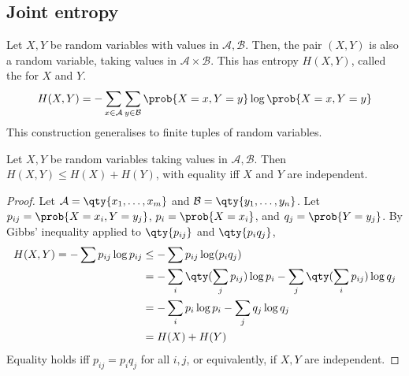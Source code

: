 \subsection{Joint entropy}
Let $X, Y$ be random variables with values in $\mathcal A, \mathcal B$.
Then, the pair $(X, Y)$ is also a random variable, taking values in $\mathcal A \times \mathcal B$.
This has entropy $H(X,Y)$, called the  for $X$ and $Y$.
\begin{align*}
    H(X,Y) = - \sum_{x \in \mathcal A} \sum_{y \in \mathcal B} \prob{X = x, Y = y} \log \prob{X = x, Y = y}
\end{align*}
This construction generalises to finite tuples of random variables.

\begin{lemma}
    Let $X, Y$ be random variables taking values in $\mathcal A, \mathcal B$.
    Then $H(X,Y) \leq H(X) + H(Y)$, with equality iff $X$ and $Y$ are independent.
\end{lemma}

\begin{proof}
    Let $\mathcal A = \qty{x_1, \dots, x_m}$ and $\mathcal B = \qty{y_1, \dots, y_n}$.
    Let $p_{ij} = \prob{X = x_i, Y = y_j}$, $p_i = \prob{X = x_i}$, and $q_j = \prob{Y = y_j}$.
    By Gibbs' inequality applied to $\qty{p_{ij}}$ and $\qty{p_i q_j}$,
    \begin{align*}
        H(X,Y) = -\sum p_{ij} \log p_{ij} &\leq -\sum p_{ij} \log(p_i q_j) \\
        &= -\sum_i \qty(\sum_j p_{ij}) \log p_i - \sum_j \qty(\sum_i p_{ij}) \log q_j \\
        &= -\sum_i p_i \log p_i - \sum_j q_j \log q_j \\
        &= H(X) + H(Y)
    \end{align*}
    Equality holds iff $p_{ij} = p_i q_j$ for all $i, j$, or equivalently, if $X, Y$ are independent.
\end{proof}
